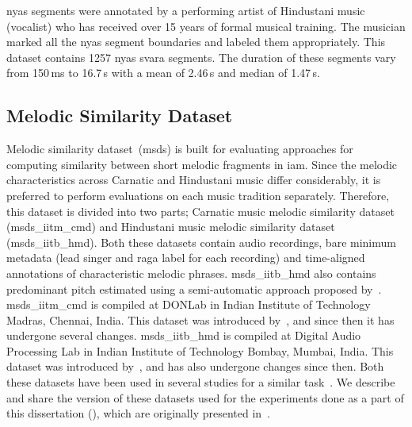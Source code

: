 {\Gls{nyas} segments were annotated by a performing artist of Hindustani music (vocalist) who has received over 15 years of formal musical training. The musician marked all the \gls{nyas} segment boundaries and labeled them appropriately. This dataset contains 1257 \gls{nyas} \gls{svara} segments. The duration of these segments vary from 150\,ms to 16.7\,s with a mean of 2.46\,s and median of 1.47\,s.



\subsection{Melodic Similarity Dataset}
\label{sec:corpus_melodic_similarity_dataset}

Melodic similarity dataset~(\acrshort{msds}) is built for evaluating approaches for computing similarity between short melodic fragments in \gls{iam}. Since the melodic characteristics across Carnatic and Hindustani music differ considerably, it is preferred to perform evaluations on each music tradition separately. Therefore, this dataset is divided into two parts; Carnatic music melodic similarity dataset (\acrshort{msds_iitm_cmd}) and Hindustani music melodic similarity dataset (\acrshort{msds_iitb_hmd}). Both these datasets contain audio recordings, bare minimum metadata (lead singer and \gls{raga} label for each recording) and time-aligned annotations of characteristic melodic phrases. \acrshort{msds_iitb_hmd} also contains predominant pitch estimated using a semi-automatic approach proposed by~\cite{rao2010vocal,rao2009applications}. \acrshort{msds_iitm_cmd} is compiled at DONLab in Indian Institute of Technology Madras, Chennai, India. This dataset was introduced by~\cite{Ishwar2013}, and since then it has undergone several changes. \acrshort{msds_iitb_hmd} is compiled at Digital Audio Processing Lab in Indian Institute of Technology Bombay, Mumbai, India. This dataset was introduced by~\cite{Ross2012b}, and has also undergone changes since then. Both these datasets have been used in several studies for a similar task~\cite{Ishwar2013, Ross2012b, Rao2014}.  We describe and share the version of these datasets used for the experiments done as a part of this dissertation (), which are originally presented in~\cite{gulati_ICASSP2015,gulati_ISMIR_2015}.

}
